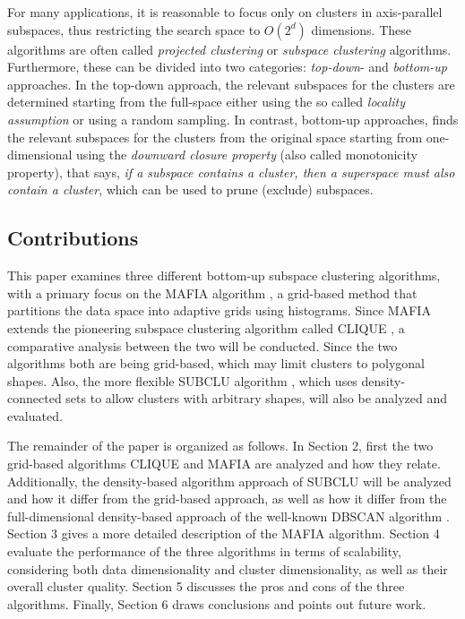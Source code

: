 For many applications, it is reasonable to focus only on clusters in axis-parallel subspaces, thus restricting the search space to $O(2^d)$ dimensions. These algorithms are often called \textit{projected clustering} or \textit{subspace clustering} algorithms. Furthermore, these can be divided into two categories: \textit{top-down}- and \textit{bottom-up} approaches. In the top-down approach, the relevant subspaces for the clusters are determined starting from the full-space either using the so called \textit{locality assumption} or using a random sampling. In contrast, bottom-up approaches, finds the relevant subspaces for the clusters from the original space starting from one-dimensional using the \textit{downward closure property} (also called monotonicity property), that says, \textit{if a subspace contains a cluster, then a superspace must also contain a cluster}, which can be used to prune (exclude) subspaces. \cite[p.~8,~11]{kriegel-2009}

\subsection{Contributions}
This paper examines three different bottom-up subspace clustering algorithms, with a primary focus on the MAFIA algorithm \cite{mafia}, a grid-based method that partitions the data space into adaptive grids using histograms. Since MAFIA extends the pioneering subspace clustering algorithm called CLIQUE \cite{clique}, a comparative analysis between the two will be conducted. Since the two algorithms both are being grid-based, which may limit clusters to polygonal shapes. Also, the more flexible SUBCLU algorithm \cite{subclu}, which uses density-connected sets to allow clusters with arbitrary shapes, will also be analyzed and evaluated.

The remainder of the paper is organized as follows. In Section 2, first the two grid-based algorithms CLIQUE and MAFIA are analyzed and how they relate. Additionally, the density-based algorithm approach of SUBCLU will be analyzed and how it differ from the grid-based approach, as well as how it differ from the full-dimensional density-based approach of the well-known DBSCAN algorithm \cite{dbscan}. Section 3 gives a more detailed description of the MAFIA algorithm. Section 4 evaluate the performance of the three algorithms in terms of scalability, considering both data dimensionality and cluster dimensionality, as well as their overall cluster quality. Section 5 discusses the pros and cons of the three algorithms. Finally, Section 6 draws conclusions and points out future work.